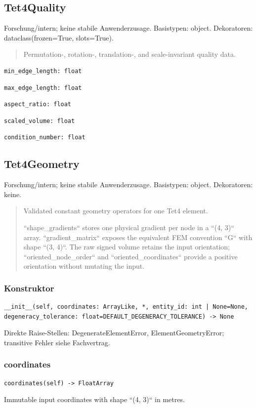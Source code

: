 \subsection{Tet4Quality}
Forschung/intern; keine stabile Anwenderzusage.
Basistypen: object. Dekoratoren: dataclass(frozen=True, slots=True).
\begin{quote}
Permutation-, rotation-, translation-, and scale-invariant quality data.
\end{quote}
\begin{lstlisting}
min_edge_length: float
\end{lstlisting}
\begin{lstlisting}
max_edge_length: float
\end{lstlisting}
\begin{lstlisting}
aspect_ratio: float
\end{lstlisting}
\begin{lstlisting}
scaled_volume: float
\end{lstlisting}
\begin{lstlisting}
condition_number: float
\end{lstlisting}
\subsection{Tet4Geometry}
Forschung/intern; keine stabile Anwenderzusage.
Basistypen: object. Dekoratoren: keine.
\begin{quote}
Validated constant geometry operators for one Tet4 element.\par ``shape\_gradients`` stores one physical gradient per node in a ``(4, 3)`` array. ``gradient\_matrix`` exposes the equivalent FEM convention ``G`` with shape ``(3, 4)``. The raw signed volume retains the input orientation; ``oriented\_node\_order`` and ``oriented\_coordinates`` provide a positive orientation without mutating the input.
\end{quote}
\subsubsection*{Konstruktor}
\begin{lstlisting}
__init__(self, coordinates: ArrayLike, *, entity_id: int | None=None, degeneracy_tolerance: float=DEFAULT_DEGENERACY_TOLERANCE) -> None
\end{lstlisting}
Direkte Raise-Stellen: DegenerateElementError, ElementGeometryError; transitive Fehler siehe Fachvertrag.
\subsubsection*{coordinates}
\begin{lstlisting}
coordinates(self) -> FloatArray
\end{lstlisting}
Immutable input coordinates with shape ``(4, 3)`` in metres.
